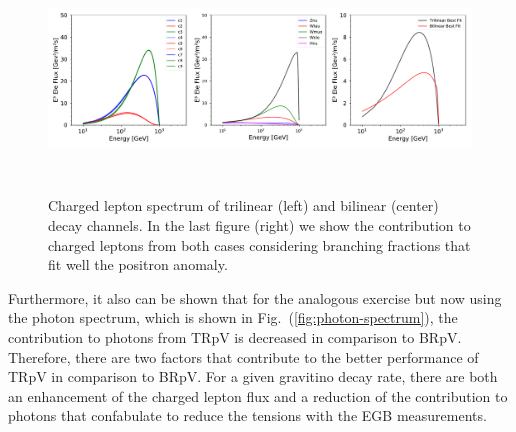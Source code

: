 \documentclass[a4paper,11pt]{article}
\begin{document}
\begin{figure}[htb]
\begin{center}
\includegraphics[height=6cm,width=16cm,angle=0]{Figures/exp_plots_electron_flux_comparison.pdf}
\caption{Charged lepton spectrum of trilinear (left) and bilinear (center) decay channels. In the last figure (right) we show the contribution to charged leptons from both cases considering branching fractions that fit well the positron anomaly.}
\label{fig:positron-spectrum}
\end{center}
\end{figure}

Furthermore, it also can be shown that for the analogous exercise but now using the photon spectrum, which is shown in Fig.~(\ref{fig:photon-spectrum}), the contribution to photons from TRpV is decreased in comparison to BRpV. Therefore, there are two factors that contribute to the better performance of TRpV in comparison to BRpV. For a given gravitino decay rate, there are both an enhancement of the charged lepton flux and a reduction of the contribution to photons that confabulate to reduce the tensions with the EGB measurements.
\end{document}
